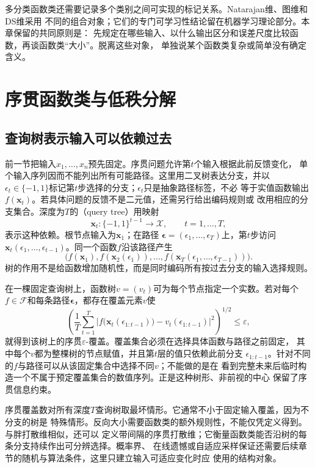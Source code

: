多分类函数类还需要记录多个类别之间可实现的标记关系。Natarajan维、图维和DS维采用
不同的组合对象；它们的专门可学习性结论留在机器学习理论部分。本章保留的共同原则是：
先规定在哪些输入、以什么输出区分和误差尺度比较函数，再谈函数类“大小”。脱离这些对象，
单独说某个函数类复杂或简单没有确定含义。

\section{序贯函数类与低秩分解}
\label{sec:functional-sequential-classes-low-rank}

\subsection{查询树表示输入可以依赖过去}

前一节把输入$x_1,\ldots,x_n$预先固定。序贯问题允许第$t$个输入根据此前反馈变化，
单个输入序列因而不能列出所有可能路径。这里用二叉树表达分支，并以
$\epsilon_t\in\{-1,1\}$标记第$t$步选择的分支；$\epsilon_t$只是抽象路径标签，不必
等于实值函数输出$f(\bm{x}_t)$。若具体问题的反馈不是二元值，还需另行给出编码规则或
改用相应的分支集合。深度为$T$的（query tree）用映射
\[
  \bm{x}_t:\{-1,1\}^{t-1}\to\mathcal{X},
  \qquad t=1,\ldots,T,
\]
表示这种依赖。根节点输入为$\bm{x}_1$；在路径
$\bm{\epsilon}=(\epsilon_1,\ldots,\epsilon_T)$上，第$t$步访问
$\bm{x}_t(\epsilon_1,\ldots,\epsilon_{t-1})$。同一个函数$f$沿该路径产生
\[
  \bigl(
    f(\bm{x}_1),
    f(\bm{x}_2(\epsilon_1)),
    \ldots,
    f(\bm{x}_T(\epsilon_1,\ldots,\epsilon_{T-1}))
  \bigr).
\]
树的作用不是给函数增加随机性，而是同时编码所有按过去分支的输入选择规则。

在一棵固定查询树上，函数树$v=(v_t)$可为每个节点指定一个实数。若对每个
$f\in\mathcal{F}$和每条路径$\bm{\epsilon}$，都存在覆盖元素$v$使
\begin{equation}
  \left(
    \frac1T\sum_{t=1}^{T}
    \left|
      f\bigl(\bm{x}_t(\epsilon_{1:t-1})\bigr)
      -
      v_t(\epsilon_{1:t-1})
    \right|^2
  \right)^{1/2}
  \leq\varepsilon,
  \label{eq:functional-sequential-cover}
\end{equation}
就得到该树上的序贯$\varepsilon$-覆盖。覆盖集合必须在选择具体函数与路径之前固定，
其中每个$v$都为整棵树的节点赋值，并且第$t$层的值只依赖此前分支
$\epsilon_{1:t-1}$。针对不同的$f$与路径可以从该固定集合中选择不同$v$；不能做的是在
看到完整未来后临时构造一个不属于预定覆盖集合的数值序列。正是这种树形、非前视的中心
保留了序贯信息约束。

序贯覆盖数对所有深度$T$查询树取最坏情形。它通常不小于固定输入覆盖，因为不分支的树是
特殊情形。反向大小需要函数类的额外规则性，不能仅凭定义得到。与胖打散维相似，还可以
定义带间隔的序贯打散维；它衡量函数类能否沿树的每条分支持续作出可分辨选择。概率界、
在线遗憾或自适应采样保证还需要后续章节的随机与算法条件，这里只建立输入可适应变化时应
使用的结构对象。

